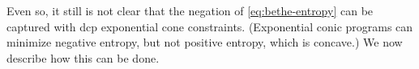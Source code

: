 \documentclass{article}
\begin{document}
Even so,
it still is not clear that the negation of \eqref{eq:bethe-entropy} can be
captured with dcp exponential cone constraints.
(Exponential conic programs can minimize negative entropy,
 but not positive entropy, which is concave.)
We now describe how this can be done.

\def\Par{\mathrm{Par}}
\def\Pash{\mathit{V\mskip-5muC\mskip-3.5muP\!}}
\end{document}
